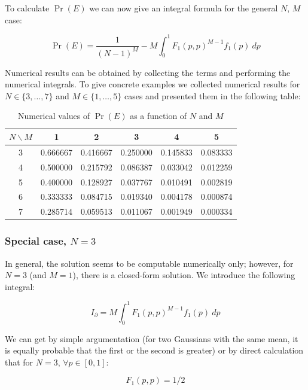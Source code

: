 \documentclass{article}
\theoremstyle{definition}
\begin{document}
To calculate $\Pr(E)$ we can now give an integral formula for the general $N$, $M$ case:

\begin{equation}
    \Pr(E) 
    = 
    \frac{1}{(N-1)^M}
    - M \int_0^1
    F_1(p,p)^{M-1} f_1(p)
    \ d p
\end{equation}

Numerical results can be obtained by collecting the terms and performing the numerical integrals. To give concrete examples we collected numerical results for $N \in \{3,\dots,7\}$ and $M \in \{1,\dots,5\}$ cases and presented them in the following table:

\begin{table}[H]
\centering
\begin{tabular}{|c|c|c|c|c|c|}
\hline
$N \backslash M$ & 1 & 2 & 3 & 4 & 5 \\ \hline
3 & 0.666667 & 0.416667 & 0.250000 & 0.145833 & 0.083333 \\ \hline
4 & 0.500000 & 0.215792 & 0.086387 & 0.033042 & 0.012259 \\ \hline
5 & 0.400000 & 0.128927 & 0.037767 & 0.010491 & 0.002819 \\ \hline
6 & 0.333333 & 0.084715 & 0.019340 & 0.004178 & 0.000874 \\ \hline
7 & 0.285714 & 0.059513 & 0.011067 & 0.001949 & 0.000334 \\ \hline
\end{tabular}
\caption{Numerical values of $\Pr(E)$ as a function of $N$ and $M$}
\end{table}

\subsubsection{Special case, $N=3$}

In general, the solution seems to be computable numerically only; however, for $N=3$ (and $M=1$), there is a closed-form solution.
We introduce the following integral:

\begin{equation}
    I_\partial = M \int_0^1 F_1(p,p)^{M-1} f_1(p) \ dp
\end{equation}

We can get by simple argumentation (for two Gaussians with the same mean, it is equally probable that the first or the second is greater) or by direct calculation that for $N=3$, $\forall p \in [0,1]$:

\begin{equation}
    F_1(p,p) = 1/2
\end{equation}
\end{document}

